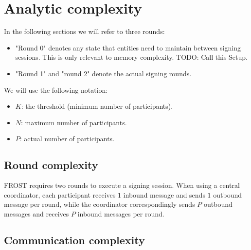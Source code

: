 
\section{Analytic complexity}\label{section:complexity}


In the following sections we will refer to three rounds:
\begin{itemize}
	\item "Round 0" denotes any state that entities need to maintain between signing
  sessions. This is only relevant to memory complexity. TODO: Call this Setup.
  \item "Round 1" and "round 2" denote the actual signing rounds.
\end{itemize}

We will use the following notation:
\begin{itemize}
	\item $K$: the threshold (minimum number of participants).
	\item $N$: maximum number of participants.
	\item $P$: actual number of participants.
\end{itemize}

\subsection{Round complexity}

FROST requires two rounds to execute a signing session. When using a central
coordinator, each participant receives $1$ inbound message and sends $1$
outbound message per round, while the coordinator correspondingly sends $P$
outbound messages and receives $P$ inbound messages per round.

\subsection{Communication complexity}

